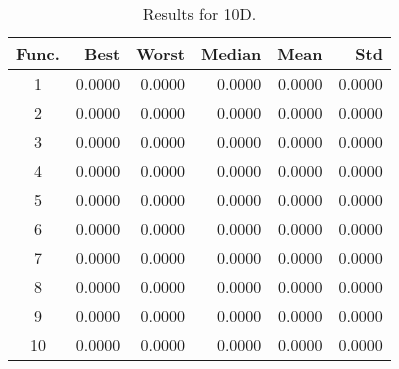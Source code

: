 \begin{table}[ht]
\centering
\caption{ Results for 10D. }
\label{tab:10D}
\begin{tabular}{crrrrr}
\hline
{Func.} & Best & Worst & Median & Mean & Std \\
\hline
1 & 0.0000 & 0.0000 & 0.0000 & 0.0000 & 0.0000 \\
2 & 0.0000 & 0.0000 & 0.0000 & 0.0000 & 0.0000 \\
3 & 0.0000 & 0.0000 & 0.0000 & 0.0000 & 0.0000 \\
4 & 0.0000 & 0.0000 & 0.0000 & 0.0000 & 0.0000 \\
5 & 0.0000 & 0.0000 & 0.0000 & 0.0000 & 0.0000 \\
6 & 0.0000 & 0.0000 & 0.0000 & 0.0000 & 0.0000 \\
7 & 0.0000 & 0.0000 & 0.0000 & 0.0000 & 0.0000 \\
8 & 0.0000 & 0.0000 & 0.0000 & 0.0000 & 0.0000 \\
9 & 0.0000 & 0.0000 & 0.0000 & 0.0000 & 0.0000 \\
10 & 0.0000 & 0.0000 & 0.0000 & 0.0000 & 0.0000 \\
\hline
\end{tabular}
\end{table}
